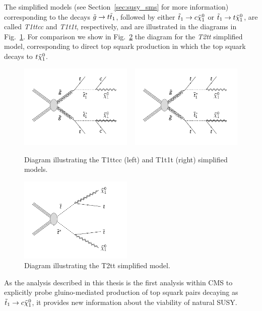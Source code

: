 The simplified models (see Section~\ref{sec:susy_sms} for more information) corresponding to the
decays $\tilde{g} \rightarrow t \tilde{t}_1$, followed by either $\tilde{t}_1 \rightarrow c \tilde{\chi}_1^0$ or
$\tilde{t}_1 \rightarrow t \tilde{\chi}_1^0$, are called \textit{T1ttcc} and \textit{T1t1t}, respectively, and are
illustrated in the diagrams in Fig.~\ref{fig:T1ttcc_T1t1t_diagrams}. For comparison we show in
Fig.~\ref{fig:T2tt_diagram} the diagram for the \textit{T2tt} simplified model, corresponding to
direct top squark production in which the top squark decays to $t \tilde{\chi}_1^0$. 

\begin{figure}
  \centering
  \includegraphics[width=0.48\textwidth,clip=true,trim=0 0.7cm 0 0]
{figures/razor_interpretation/T1ttcc}
  ~
  \includegraphics[width=0.48\textwidth,clip=true,trim=0 0.7cm 0 0]
{figures/razor_interpretation/T1t1t}
  \caption{Diagram illustrating the T1ttcc (left) and T1t1t (right) simplified models.
  \label{fig:T1ttcc_T1t1t_diagrams}}
\end{figure}
\begin{figure}
  \centering
  \includegraphics[width=0.48\textwidth,clip=true,trim=0 0.7cm 0 0]{figures/razor_motivation/T2tt}
  \caption{Diagram illustrating the T2tt simplified model.
  \label{fig:T2tt_diagram}}
\end{figure}


As the analysis described in this thesis is the first analysis within CMS to explicitly probe
gluino-mediated production of top squark pairs decaying as $\tilde{t}_1 \rightarrow c \tilde{\chi}_1^0$, it
provides new information about the viability of natural SUSY. 

